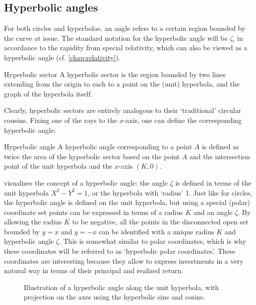 \subsection{Hyperbolic angles}
For both circles and hyperbolae, an angle refers to a certain region bounded by the curve at issue. The standard notation for the hyperbolic angle will be \(\zeta\), in accordance to the rapidity from special relativity, which can also be viewed as a hyperbolic angle (cf. \cref{chap:relativity}).
\begin{thmblock}{Hyperbolic sector}
A hyperbolic sector is the region bounded by two lines extending from the origin to each to a point on the (unit) hyperbola, and the graph of the hyperbola itself. 
\end{thmblock}
Clearly, hyperbolic sectors are entirely analogous to their `traditional' circular cousins. Fixing one of the rays to the \(x\)-axis, one can define the corresponding hyperbolic angle:
\begin{thmblock}{Hyperbolic angle}
A hyperbolic angle corresponding to a point \(A\) is defined as twice the area of the hyperbolic sector based on the point \(A\) and the intersection point of the unit hyperbola and the \(x\)-axis \((K, 0)\).
\end{thmblock}
 visualizes the concept of a hyperbolic angle: the angle $\zeta$ is defined in terms of the unit hyperbola $X^2 - Y^2 = 1$, or the hyperbola with `radius' 1. 
Just like for circles, the hyperbolic angle is defined on the unit hyperbola, but using a special (polar) coordinate set points can be expressed in terms of a radius $K$ and an angle $\zeta$. By allowing the radius \(K\) to be negative, all the points in the disconnected open set bounded by \(y = x\) and \(y = -x\) can be identified with a unique radius \(K\) and hyperbolic angle \(\zeta\). This is somewhat similar to polar coordinates, which is why these coordinates will be referred to as `hyperbolic polar coordinates'. These coordinates are interesting because they allow to express investments in a very natural way in terms of their principal and realized return. 
\begin{figure}[ht!]
    \centering
    
    \caption{Illustration of a hyperbolic angle along the unit hyperbola, with projection on the axes using the hyperbolic sine and cosine.}
    \label{fig:hyperbolic_angle}
\end{figure}

